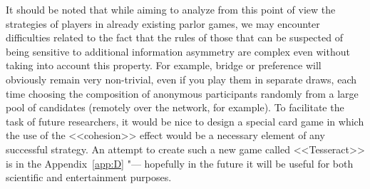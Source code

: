 It should be noted that while aiming to analyze from this point of view the strategies of players in already existing parlor games, we may encounter difficulties related to the fact that the rules of those that can be suspected of being sensitive to additional information asymmetry are complex even without taking into account this property. For example, bridge or preference will obviously remain very non-trivial, even if you play them in separate draws, each time choosing the composition of anonymous participants randomly from a large pool of candidates (remotely over the network, for example). To facilitate the task of future researchers, it would be nice to design a special card game in which the use of the <<cohesion>> effect would be a necessary element of any successful strategy. An attempt to create such a new game called <<Tesseract>> is in the Appendix~\cref{app:D} "--- hopefully in the future it will be useful for both scientific and entertainment purposes. %

